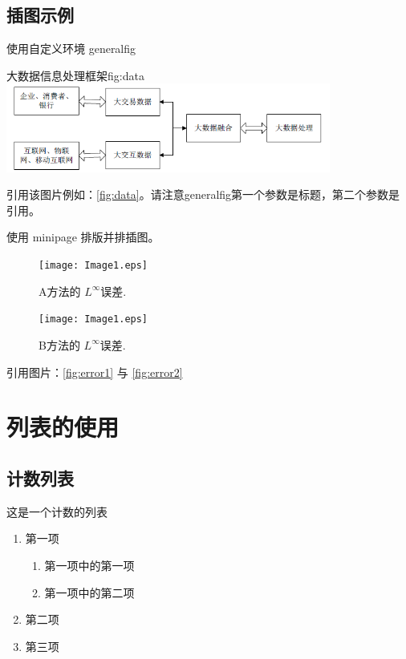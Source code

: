 \documentclass{shnuthesis}
\begin{document}
\section{插图示例}

使用自定义环境 generalfig
	
\begin{generalfig}[htb]{大数据信息处理框架}{fig:data}
		\includegraphics[width=0.8\textwidth]{Figures/data.png}
\end{generalfig}

引用该图片例如：\autoref{fig:data}。请注意generalfig第一个参数是标题，第二个参数是引用。

使用 minipage 排版并排插图。

\begin{figure}[htp!]
\begin{minipage}[h]{0.48\linewidth}
\centering
  \texttt{[image: Image1.eps]}
    \caption{A方法的 $L^\infty$误差.}
    \label{fig:error1}
\end{minipage}
  \hfill\quad
\begin{minipage}[h]{0.48\linewidth}
\centering
   \texttt{[image: Image1.eps]}
   \caption{B方法的 $L^\infty$误差.}
   \label{fig:error2}
\end{minipage}
\end{figure}

引用图片：\autoref{fig:error1} 与 \autoref{fig:error2}

\chapter{列表的使用}

\section{计数列表}

这是一个计数的列表
\begin{enumerate}
	\item 第一项
		\begin{enumerate}
			\item 第一项中的第一项
			\item 第一项中的第二项
		\end{enumerate}
	\item 第二项
	\item 第三项
\end{enumerate}
\end{document}
